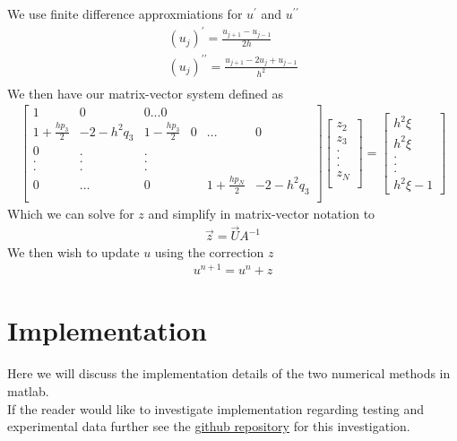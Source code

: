 \documentclass{article}
\begin{document}
\begin{enumerate}
We use finite difference approxmiations for $u^\prime$ and $u^{\prime\prime}$
\begin{align}
(u_j)^\prime = \frac{u_{j+1} - u_{j-1}}{2h} \\
(u_j)^{\prime\prime} = \frac{u_{j+1} - 2u_{j} + u_{j-1}}{h^2} \\
\end{align}
We then have our matrix-vector system defined as
\begin{align}
\begin{bmatrix}
1 & 0 & 0 ... 0 \\
1 + \frac{hp_3}{2} & -2 - h^2q_3 & 1 - \frac{hp_3}{2} & 0 &...& 0\\
0 & . & . \\
. & . & . \\
. & . & . \\
0 & ... &0 & & 1 + \frac{hp_N}{2} & -2 - h^2q_3 \\
\end{bmatrix}
\begin{bmatrix}
z_2 \\ z_3 \\ . \\ . \\ . \\ z_N\\
\end{bmatrix}
=
\begin{bmatrix}
h^2 \xi \\
h^2 \xi \\
. \\
. \\
. \\
h^2 \xi - 1
\end{bmatrix}
\end{align}
Which we can solve for $z$ and simplify in matrix-vector notation to
\begin{align}
\vec{z} = \vec{U} A^{-1} 
\end{align}
We then wish to update $u$ using the correction $z$
\begin{align}
u^{n + 1} = u^{n} + z
\end{align}
\end{enumerate}
\section{Implementation}
Here we will discuss the implementation details of the two numerical methods in matlab. \\
If the reader would like to investigate implementation regarding testing and experimental data further see the \href{https://github.com/Liam-Watson/3AN-Vortex-Solutions}{ github repository} for this investigation.
\end{document}
